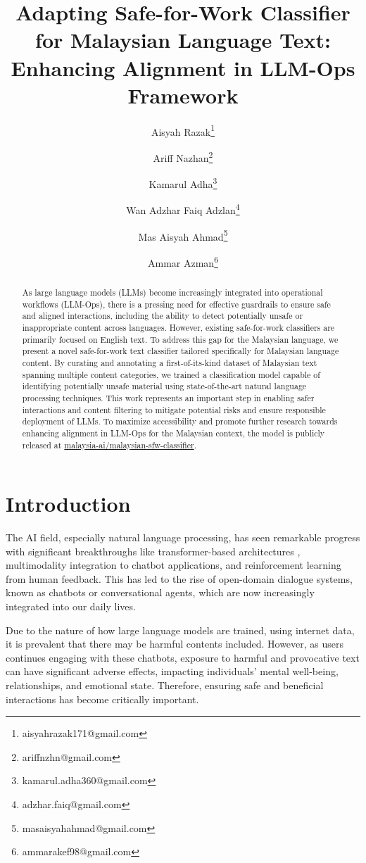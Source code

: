 \documentclass[preprint]{article}
\title{Adapting Safe-for-Work Classifier for Malaysian Language Text: Enhancing Alignment in LLM-Ops Framework}
\author{
  Aisyah Razak\thanks{aisyahrazak171@gmail.com} \and
  Ariff Nazhan\thanks{ariffnzhn@gmail.com} \and
  Kamarul Adha\thanks{kamarul.adha360@gmail.com} \and
  Wan Adzhar Faiq Adzlan\thanks{adzhar.faiq@gmail.com} \and
  Mas Aisyah Ahmad\thanks{masaisyahahmad@gmail.com} \and
  Ammar Azman\thanks{ammarakef98@gmail.com} \and
}
\begin{document}
\maketitle

\begin{abstract}

  As large language models (LLMs) become increasingly integrated into operational workflows (LLM-Ops), there is a pressing need for effective guardrails to ensure safe and aligned interactions, including the ability to detect potentially unsafe or inappropriate content across languages. However, existing safe-for-work classifiers are primarily focused on English text. To address this gap for the Malaysian language, we present a novel safe-for-work text classifier tailored specifically for Malaysian language content. By curating and annotating a first-of-its-kind dataset of Malaysian text spanning multiple content categories, we trained a classification model capable of identifying potentially unsafe material using state-of-the-art natural language processing techniques. This work represents an important step in enabling safer interactions and content filtering to mitigate potential risks and ensure responsible deployment of LLMs. To maximize accessibility and promote further research towards enhancing alignment in LLM-Ops for the Malaysian context, the model is publicly released at \href{https://huggingface.co/malaysia-ai/malaysian-sfw-classifier}{malaysia-ai/malaysian-sfw-classifier}.
\end{abstract}


\section{Introduction}

The AI field, especially natural language processing, \cite{markov2023holistic} has seen remarkable progress with significant breakthroughs like transformer-based architectures \cite{vaswani2023attentionneed}, multimodality integration to chatbot applications, and reinforcement learning from human feedback. This has led to the rise of open-domain dialogue systems, known as chatbots or conversational agents, which are now increasingly integrated into our daily lives.

Due to the nature of how large language models are trained, using internet data, it is prevalent that there may be harmful contents included. However, as users continues engaging with these chatbots, exposure to harmful and provocative text can have significant adverse effects, impacting individuals' mental well-being, relationships, and emotional state. Therefore, ensuring safe and beneficial interactions has become critically important.
\end{document}

